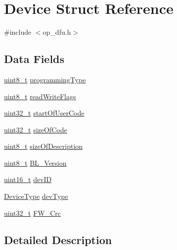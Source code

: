 \hypertarget{struct_device}{\section{Device Struct Reference}
\label{struct_device}
}


{\ttfamily \#include $<$op\-\_\-dfu.\-h$>$}

\subsection*{Data Fields}
\begin{DoxyCompactItemize}
\item 
\hyperlink{stdint_8h_aba7bc1797add20fe3efdf37ced1182c5}{uint8\-\_\-t} \hyperlink{struct_device_a233c334d07cb137f8460511393f09b1f}{programming\-Type}
\item 
\hyperlink{stdint_8h_aba7bc1797add20fe3efdf37ced1182c5}{uint8\-\_\-t} \hyperlink{struct_device_a9c191d83ffbfc96da5ddb6bfed066afb}{read\-Write\-Flags}
\item 
\hyperlink{stdint_8h_a435d1572bf3f880d55459d9805097f62}{uint32\-\_\-t} \hyperlink{struct_device_a34965e275b7c25a39a849f168098b130}{start\-Of\-User\-Code}
\item 
\hyperlink{stdint_8h_a435d1572bf3f880d55459d9805097f62}{uint32\-\_\-t} \hyperlink{struct_device_a83624b47fe4a34ab22c97ef29934bc80}{size\-Of\-Code}
\item 
\hyperlink{stdint_8h_aba7bc1797add20fe3efdf37ced1182c5}{uint8\-\_\-t} \hyperlink{struct_device_aac3d654cfb50d91e3d886848c630d481}{size\-Of\-Description}
\item 
\hyperlink{stdint_8h_aba7bc1797add20fe3efdf37ced1182c5}{uint8\-\_\-t} \hyperlink{struct_device_ae487fa50d1de851605401068ef8730fb}{B\-L\-\_\-\-Version}
\item 
\hyperlink{stdint_8h_a273cf69d639a59973b6019625df33e30}{uint16\-\_\-t} \hyperlink{struct_device_ac279d7f2e95b5ea61c2838cace97e0f3}{dev\-I\-D}
\item 
\hyperlink{group___copter_control_b_l_gad258d4c51629346fceac4679b3209ad9}{Device\-Type} \hyperlink{struct_device_a94b1db8f05f4e21fc5f00333a46c2352}{dev\-Type}
\item 
\hyperlink{stdint_8h_a435d1572bf3f880d55459d9805097f62}{uint32\-\_\-t} \hyperlink{struct_device_a676a5d429497021b5ad095b527f935cc}{F\-W\-\_\-\-Crc}
\end{DoxyCompactItemize}


\subsection{Detailed Description}


